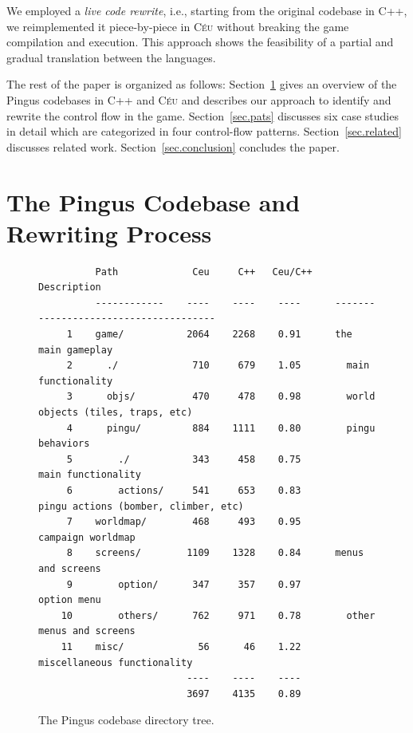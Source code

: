 \documentclass[10pt, conference, compsocconf]{IEEEtran}
\newcommand{\CEU}{\textsc{C\'{e}u}\xspace}
\begin{document}
We employed a \emph{live code rewrite}, i.e., starting from the original
codebase in C++, we reimplemented it piece-by-piece in \CEU without breaking
the game compilation and execution.
%
This approach shows the feasibility of a partial and gradual translation
between the languages.

The rest of the paper is organized as follows:
Section~\ref{sec.codebase} gives an overview of the Pingus codebases in C++ and
\CEU and describes our approach to identify and rewrite the control flow in the
game.
Section~\ref{sec.pats} discusses six case studies in detail which are
categorized in four control-flow patterns.
Section~\ref{sec.related} discusses related work.
Section~\ref{sec.conclusion} concludes the paper.

\section{The Pingus Codebase and Rewriting Process}
\label{sec.codebase}


\begin{figure}
\begin{verbatim}
          Path             Ceu     C++   Ceu/C++    Description
          ------------    ----    ----    ----      --------------------------------------
     1    game/           2064    2268    0.91      the main gameplay
     2      ./             710     679    1.05        main functionality
     3      objs/          470     478    0.98        world objects (tiles, traps, etc)
     4      pingu/         884    1111    0.80        pingu behaviors
     5        ./           343     458    0.75          main functionality
     6        actions/     541     653    0.83          pingu actions (bomber, climber, etc)
     7    worldmap/        468     493    0.95      campaign worldmap
     8    screens/        1109    1328    0.84      menus and screens
     9        option/      347     357    0.97        option menu
    10        others/      762     971    0.78        other menus and screens
    11    misc/             56      46    1.22      miscellaneous functionality
                          ----    ----    ----
                          3697    4135    0.89
\end{verbatim}
\caption{The Pingus codebase directory tree.
\label{tab.tree}
}
\end{figure}
\end{document}
